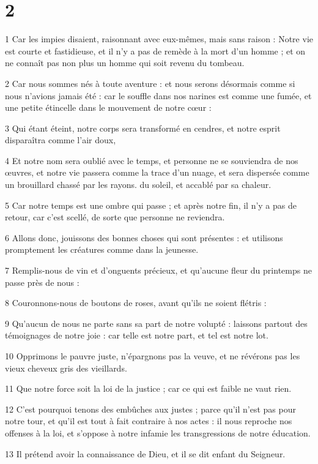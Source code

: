 \chapter{2}

\par 1 Car les impies disaient, raisonnant avec eux-mêmes, mais sans raison : Notre vie est courte et fastidieuse, et il n'y a pas de remède à la mort d'un homme ; et on ne connaît pas non plus un homme qui soit revenu du tombeau.
\par 2 Car nous sommes nés à toute aventure : et nous serons désormais comme si nous n'avions jamais été : car le souffle dans nos narines est comme une fumée, et une petite étincelle dans le mouvement de notre cœur :
\par 3 Qui étant éteint, notre corps sera transformé en cendres, et notre esprit disparaîtra comme l'air doux,
\par 4 Et notre nom sera oublié avec le temps, et personne ne se souviendra de nos œuvres, et notre vie passera comme la trace d'un nuage, et sera dispersée comme un brouillard chassé par les rayons. du soleil, et accablé par sa chaleur.
\par 5 Car notre temps est une ombre qui passe ; et après notre fin, il n'y a pas de retour, car c'est scellé, de sorte que personne ne reviendra.
\par 6 Allons donc, jouissons des bonnes choses qui sont présentes : et utilisons promptement les créatures comme dans la jeunesse.
\par 7 Remplis-nous de vin et d'onguents précieux, et qu'aucune fleur du printemps ne passe près de nous :
\par 8 Couronnons-nous de boutons de roses, avant qu'ils ne soient flétris :
\par 9 Qu'aucun de nous ne parte sans sa part de notre volupté : laissons partout des témoignages de notre joie : car telle est notre part, et tel est notre lot.
\par 10 Opprimons le pauvre juste, n'épargnons pas la veuve, et ne révérons pas les vieux cheveux gris des vieillards.
\par 11 Que notre force soit la loi de la justice ; car ce qui est faible ne vaut rien.
\par 12 C'est pourquoi tenons des embûches aux justes ; parce qu'il n'est pas pour notre tour, et qu'il est tout à fait contraire à nos actes : il nous reproche nos offenses à la loi, et s'oppose à notre infamie les transgressions de notre éducation.
\par 13 Il prétend avoir la connaissance de Dieu, et il se dit enfant du Seigneur.
